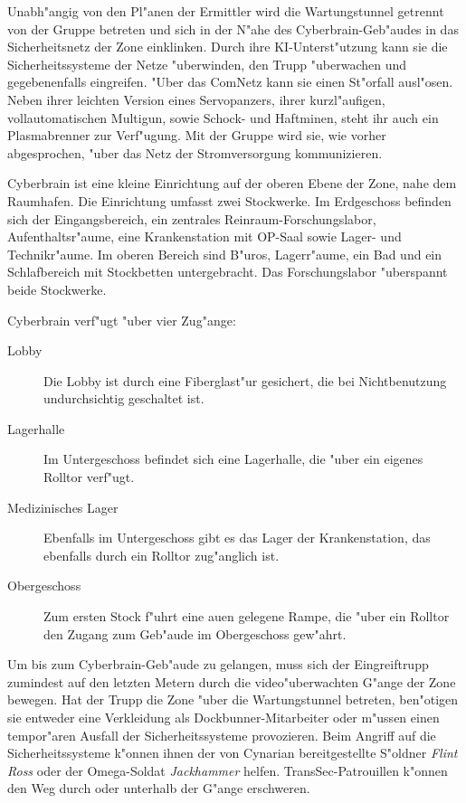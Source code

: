 Unabh"angig von den Pl"anen der Ermittler wird \xl{} die Wartungstunnel getrennt von der Gruppe betreten und sich in der N"ahe des Cyberbrain-Geb"audes in das Sicherheitsnetz der Zone einklinken. Durch ihre KI-Unterst"utzung kann sie die Sicherheitssysteme der Netze "uberwinden, den Trupp "uberwachen und gegebenenfalls eingreifen. "Uber das ComNetz kann sie einen St"orfall ausl"osen. Neben ihrer leichten Version eines Servopanzers, ihrer kurzl"aufigen, vollautomatischen Multigun, sowie Schock- und Haftminen, steht ihr auch ein Plasmabrenner zur Verf"ugung. Mit der Gruppe wird sie, wie vorher abgesprochen, "uber das Netz der Stromversorgung kommunizieren.


Cyberbrain ist eine kleine Einrichtung auf der oberen Ebene der Zone, nahe dem Raumhafen. Die Einrichtung umfasst zwei Stockwerke. Im Erdgeschoss befinden sich der Eingangsbereich, ein zentrales Reinraum-Forschungslabor, Aufenthaltsr"aume, eine Krankenstation mit OP-Saal sowie Lager- und Technikr"aume. Im oberen Bereich sind B"uros, Lagerr"aume, ein Bad und ein Schlafbereich mit Stockbetten untergebracht. Das Forschungslabor "uberspannt beide Stockwerke.

Cyberbrain verf"ugt "uber vier Zug"ange:

\begin{description}
	\item[Lobby] Die Lobby ist durch eine Fiberglast"ur gesichert, die bei Nichtbenutzung undurchsichtig geschaltet ist.
	\item[Lagerhalle] Im Untergeschoss befindet sich eine Lagerhalle, die "uber ein eigenes Rolltor verf"ugt.
	\item[Medizinisches Lager] Ebenfalls im Untergeschoss gibt es das Lager der Krankenstation, das ebenfalls durch ein Rolltor zug"anglich 		ist.
	\item[Obergeschoss] Zum ersten Stock f"uhrt eine au\3en gelegene Rampe, die "uber ein Rolltor den Zugang zum Geb"aude im Obergeschoss 	
		gew"ahrt.
\end{description}

Um bis zum Cyberbrain-Geb"aude zu gelangen, muss sich der Eingreiftrupp zumindest auf den letzten Metern durch die video"uberwachten G"ange der Zone bewegen. Hat der Trupp die Zone "uber die Wartungstunnel betreten, ben"otigen sie entweder eine Verkleidung als Dockbunner-Mitarbeiter oder m"ussen einen tempor"aren Ausfall der Sicherheitssysteme provozieren. Beim Angriff auf die Sicherheitssysteme k"onnen ihnen der von Cynarian bereitgestellte S"oldner \emph{Flint Ross} oder der Omega-Soldat \emph{Jackhammer} helfen. TransSec-Patrouillen k"onnen den Weg durch oder unterhalb der G"ange erschweren.


